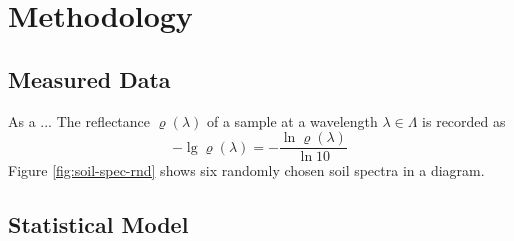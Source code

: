 \section{Methodology}
\label{sec:methodology}
	
	\subsection{Measured Data}
	\label{ssec:measured-data}
	
		As a ...
		The reflectance $\varrho(\lambda)$ of a sample at a wavelength $\lambda \in \Lambda$ is recorded as
		\[
			-\lg \varrho(\lambda) = -\frac{\ln \varrho(\lambda)}{\ln 10}
		\]
		Figure \ref{fig:soil-spec-rnd} shows six randomly chosen soil spectra in a diagram.
		\begin{figure*}
			\centering
			
			\caption{Six near infrared soil spectra of randomly chosen soil samples obtained from the data set, where $\lambda$ is the wavelength and $\rho(\lambda)$ the corresponding reflectance and each colour refers to one sample}
			\label{fig:soil-spec-rnd}
		\end{figure*}
		
	

	\subsection{Statistical Model}
	\label{ssec:statistical-model}
	
	
	

	

